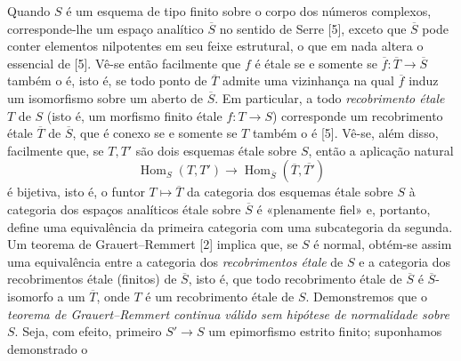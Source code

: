 Quando $S$ é um esquema de tipo finito sobre o corpo dos números
complexos, corresponde-lhe um espaço analítico $\overline S$ no sentido de
Serre [5], exceto que $\overline S$ pode conter elementos nilpotentes em seu
feixe estrutural, o que em nada altera o essencial de [5]. Vê-se então facilmente
que $f$ é étale se e somente se
$\overline f:\overline T\longrightarrow\overline S$ também o é, isto é, se todo
ponto de $\overline T$ admite uma vizinhança na qual $\overline f$ induz um
isomorfismo sobre um aberto de $\overline S$. Em particular, a todo
\emph{recobrimento étale} $T$ de $S$ (isto é, um morfismo finito étale
$f:T\longrightarrow S$) corresponde um recobrimento étale $\overline T$ de
$\overline S$, que é conexo se e somente se $T$ também o é [5]. Vê-se, além
disso, facilmente que, se $T,T'$ são dois esquemas étale sobre $S$, então a
aplicação natural
\[
  \operatorname{Hom}_S(T,T')\longrightarrow
  \operatorname{Hom}_{\overline S}(\overline T,\overline{T'})
\]
é bijetiva, isto é, o funtor $T\longmapsto\overline T$ da categoria dos
esquemas étale sobre $S$ à categoria dos espaços analíticos étale
sobre $\overline S$ é «plenamente fiel» e, portanto, define uma equivalência
da primeira categoria com uma subcategoria da segunda. Um teorema de
Grauert--Remmert [2] implica que, se $S$ é normal, obtém-se assim uma
equivalência entre a categoria dos \emph{recobrimentos étale} de $S$ e a
categoria dos recobrimentos étale (finitos) de $\overline S$, isto é, que
todo recobrimento étale de $\overline S$ é $\overline S$-isomorfo a um
$\overline T$, onde $T$ é um recobrimento étale de $S$. Demonstremos que o
\emph{teorema de Grauert--Remmert continua válido sem hipótese de
normalidade sobre $S$}. Seja, com efeito, primeiro $S'\longrightarrow S$ um
epimorfismo estrito finito; suponhamos demonstrado o

